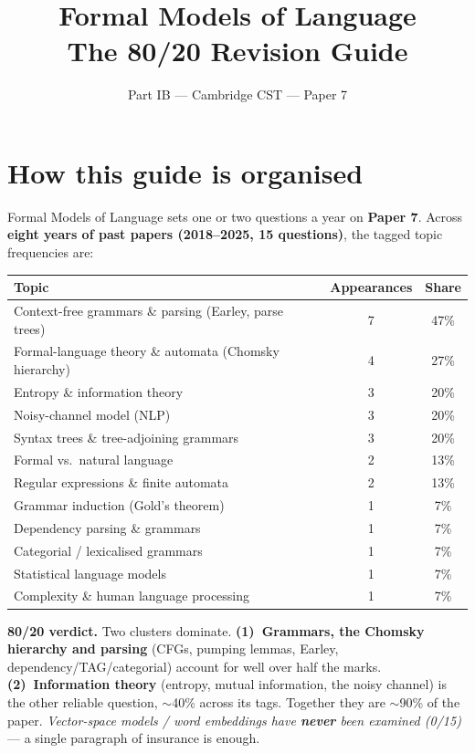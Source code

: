 \documentclass[11pt,a4paper]{article}
\title{\vspace{-1.5cm}\textbf{Formal Models of Language} \\[2pt] \large The 80/20 Revision Guide}
\author{\small Part IB --- Cambridge CST --- Paper 7}
\date{}
\begin{document}
\maketitle
\vspace{-0.8cm}

\section*{How this guide is organised}

Formal Models of Language sets one or two questions a year on \textbf{Paper 7}. Across \textbf{eight years of past papers (2018--2025, 15 questions)}, the tagged topic frequencies are:

\begin{center}
\begin{tabular}{lcc}
\hline
\textbf{Topic} & \textbf{Appearances} & \textbf{Share} \\
\hline
Context-free grammars \& parsing (Earley, parse trees) & 7 & 47\% \\
Formal-language theory \& automata (Chomsky hierarchy) & 4 & 27\% \\
Entropy \& information theory & 3 & 20\% \\
Noisy-channel model (NLP) & 3 & 20\% \\
Syntax trees \& tree-adjoining grammars & 3 & 20\% \\
Formal vs.\ natural language & 2 & 13\% \\
Regular expressions \& finite automata & 2 & 13\% \\
Grammar induction (Gold's theorem) & 1 & 7\% \\
Dependency parsing \& grammars & 1 & 7\% \\
Categorial / lexicalised grammars & 1 & 7\% \\
Statistical language models & 1 & 7\% \\
Complexity \& human language processing & 1 & 7\% \\
\hline
\end{tabular}
\end{center}

\textbf{80/20 verdict.} Two clusters dominate. \textbf{(1)~Grammars, the Chomsky hierarchy and parsing} (CFGs, pumping lemmas, Earley, dependency/TAG/categorial) account for well over half the marks. \textbf{(2)~Information theory} (entropy, mutual information, the noisy channel) is the other reliable question, $\sim$40\% across its tags. Together they are $\sim$90\% of the paper. \emph{Vector-space models / word embeddings have \textbf{never} been examined (0/15)} --- a single paragraph of insurance is enough.
\end{document}
